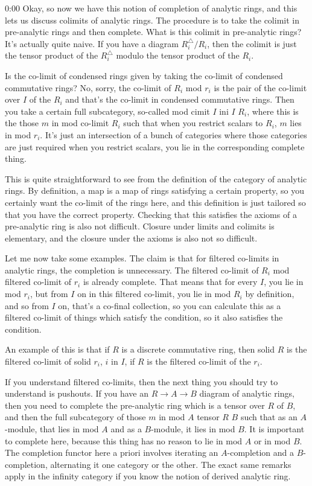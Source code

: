 \begin{unfinished}{0:00}
Okay, so now we have this notion of completion of analytic rings, and this lets us discuss colimits of analytic rings. The procedure is to take the colimit in pre-analytic rings and then complete. What is this colimit in pre-analytic rings? It's actually quite naive. If you have a diagram $R_i^\triangle /R_i$, then the colimit is just the tensor product of the $R_i^\triangle$ modulo the tensor product of the $R_i$.

Is the co-limit of condensed rings given by taking the co-limit of condensed commutative rings? No, sorry, the co-limit of $R_i$ mod $r_i$ is the pair of the co-limit over $I$ of the $R_i$ and that's the co-limit in condensed commutative rings. Then you take a certain full subcategory, so-called mod cimit $I$ ini $I$ $R_i$, where this is the those $m$ in mod co-limit $R_i$ such that when you restrict scalars to $R_i$, $m$ lies in mod $r_i$. It's just an intersection of a bunch of categories where those categories are just required when you restrict scalars, you lie in the corresponding complete thing.

This is quite straightforward to see from the definition of the category of analytic rings. By definition, a map is a map of rings satisfying a certain property, so you certainly want the co-limit of the rings here, and this definition is just tailored so that you have the correct property. Checking that this satisfies the axioms of a pre-analytic ring is also not difficult. Closure under limits and colimits is elementary, and the closure under the axioms is also not so difficult.

Let me now take some examples. The claim is that for filtered co-limits in analytic rings, the completion is unnecessary. The filtered co-limit of $R_i$ mod filtered co-limit of $r_i$ is already complete. That means that for every $I$, you lie in mod $r_i$, but from $I$ on in this filtered co-limit, you lie in mod $R_i$ by definition, and so from $I$ on, that's a co-final collection, so you can calculate this as a filtered co-limit of things which satisfy the condition, so it also satisfies the condition.

An example of this is that if $R$ is a discrete commutative ring, then solid $R$ is the filtered co-limit of solid $r_i$, $i$ in $I$, if $R$ is the filtered co-limit of the $r_i$.

If you understand filtered co-limits, then the next thing you should try to understand is pushouts. If you have an $R \to A \to B$ diagram of analytic rings, then you need to complete the pre-analytic ring which is a tensor over $R$ of $B$, and then the full subcategory of those $m$ in mod $A$ tensor $R$ $B$ such that as an $A$-module, that lies in mod $A$ and as a $B$-module, it lies in mod $B$. It is important to complete here, because this thing has no reason to lie in mod $A$ or in mod $B$. The completion functor here a priori involves iterating an $A$-completion and a $B$-completion, alternating it one category or the other. The exact same remarks apply in the infinity category if you know the notion of derived analytic ring.


\end{unfinished}
